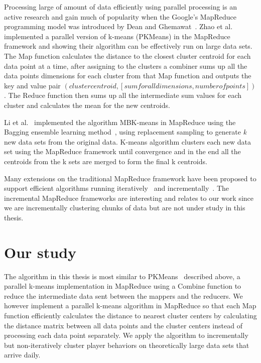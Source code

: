 Processing large of amount of data efficiently using parallel processing is an active research and gain much of popularity when the Google's MapReduce programming model was introduced by Dean and Ghemawat~\citep{Dean:2004}. Zhao et al.~\citep{Zhao:2009} implemented a parallel version of k-means (PKMeans) in the MapReduce framework and showing their algorithm can be effectively run on large data sets. The Map function calculates the distance to the closest cluster centroid for each data point at a time, after assigning to the clusters a combiner sums up all the data points dimensions for each cluster from that Map function and outputs the key and value pair $(cluster centroid, [sum for all dimensions, number of points])$. The Reduce function then sums up all the intermediate sum values for each cluster and calculates the mean for the new centroids. 

Li et al.~\citep{Li:2011} implemented the algorithm MBK-means in MapReduce using the Bagging ensemble learning method~\citep{Breiman:1996}, using replacement sampling to generate  \textit{k} new data sets from the original data. K-means algorithm clusters each new data set using the MapReduce framework until convergence and in the end all the centroids from the k sets are merged to form the final k centroids.

Many extensions on the traditional MapReduce framework have been proposed to support efficient algorithms running iteratively~\citep{Condie:2010HadoopOnline, Ekanayake:2010Twister, Zaharia:2010Spark, Bu:2010HaLoop, Bu:2012HaLoop, Yan:2012IncMr} and incrementally~\citep{Bhatotia:2011Incoop, Yan:2012IncMr, Bhatotia:2012Slider}. The incremental MapReduce frameworks are interesting and relates to our work since we are incrementally clustering chunks of data but are not under study in this thesis.

\section{Our study}
The algorithm in this thesis is most similar to PKMeans~\citep{Zhao:2009} described above, a parallel k-means implementation in MapReduce using a Combine function to reduce the intermediate data sent between the mappers and the reducers. We however implement a parallel k-means algorithm in MapReduce so that each Map function efficiently calculates the distance to nearest cluster centers by calculating the distance matrix between all data points and the cluster centers instead of processing each data point separately. We apply the algorithm to incrementally but non-iteratively cluster player behaviors on theoretically large data sets that arrive daily. 

